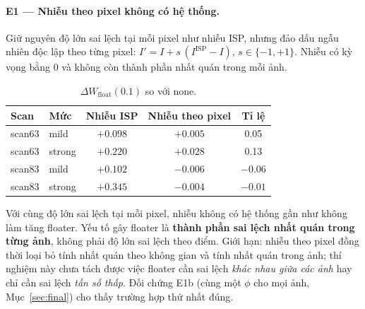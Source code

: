 \documentclass[11pt,a4paper]{article}
\begin{document}
\paragraph{E1 --- Nhiễu theo pixel không có hệ thống.} Giữ nguyên độ lớn sai lệch tại mỗi pixel như nhiễu ISP, nhưng đảo dấu ngẫu nhiên độc lập theo từng pixel: $I'=I+s\,(I^{\text{ISP}}-I)$, $s\in\{-1,+1\}$. Nhiễu có kỳ vọng bằng 0 và không còn thành phần nhất quán trong mỗi ảnh.
\begin{table}[H]
\centering\small
\caption{$\Delta W_{\text{float}}(0.1)$ so với none.}
\begin{tabular}{@{}llccc@{}}
\toprule
Scan & Mức & Nhiễu ISP & Nhiễu theo pixel & Tỉ lệ \\
\midrule
scan63 & mild & $+0.098$ & $+0.005$ & 0.05 \\
scan63 & strong & $+0.220$ & $+0.028$ & 0.13 \\
scan83 & mild & $+0.102$ & $-0.006$ & $-0.06$ \\
scan83 & strong & $+0.345$ & $-0.004$ & $-0.01$ \\
\bottomrule
\end{tabular}
\end{table}
Với cùng độ lớn sai lệch tại mỗi pixel, nhiễu không có hệ thống gần như không làm tăng floater. Yếu tố gây floater là \textbf{thành phần sai lệch nhất quán trong từng ảnh}, không phải độ lớn sai lệch theo điểm. Giới hạn: nhiễu theo pixel đồng thời loại bỏ tính nhất quán theo không gian và tính nhất quán trong ảnh; thí nghiệm này chưa tách được việc floater cần sai lệch \emph{khác nhau giữa các ảnh} hay chỉ cần sai lệch \emph{tần số thấp}. Đối chứng E1b (cùng một $\phi$ cho mọi ảnh, Mục~\ref{sec:final}) cho thấy trường hợp thứ nhất đúng.
\end{document}
